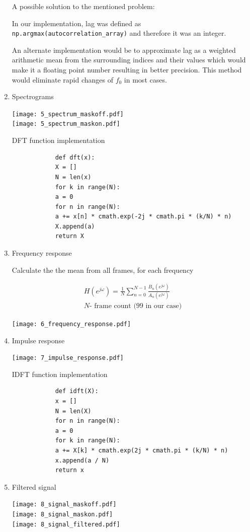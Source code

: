 \documentclass[a4paper, 11pt]{article}
\begin{document}
\begin{enumerate}
		\vspace{2mm}
		A possible solution to the mentioned problem:

		In our implementation, lag was defined as \texttt{np.argmax(autocorrelation\_array)} and therefore it was an integer.

		An alternate implementation would be to approximate lag as a weighted arithmetic mean from the surrounding indices and their values
		which would make it a floating point number resulting in better precision.
		This method would eliminate rapid changes of $f_0$ in most cases.

		\item
		Spectrograms

		\texttt{[image: 5\_spectrum\_maskoff.pdf]} \\
		\texttt{[image: 5\_spectrum\_maskon.pdf]}

		\newpage

		DFT function implementation

		\begin{verbatim}
			def dft(x):
			X = []
			N = len(x)
			for k in range(N):
			a = 0
			for n in range(N):
			a += x[n] * cmath.exp(-2j * cmath.pi * (k/N) * n)
			X.append(a)
			return X
		\end{verbatim}

		\item
		Frequency response

		Calculate the the mean from all frames, for each frequency

		\begin{gather*}
			H(e^{j\omega}) = \frac{1}{N} \sum_{n=0}^{N-1} \frac{ B_n(e^{j\omega}) }{ A_n(e^{j\omega}) } \\
			N \text{- frame count (99 in our case)}
		\end{gather*}

		\texttt{[image: 6\_frequency\_response.pdf]}

		\item
		Impulse response

		\texttt{[image: 7\_impulse\_response.pdf]}

		IDFT function implementation

		\begin{verbatim}
			def idft(X):
			x = []
			N = len(X)
			for n in range(N):
			a = 0
			for k in range(N):
			a += X[k] * cmath.exp(2j * cmath.pi * (k/N) * n)
			x.append(a / N)
			return x
		\end{verbatim}

		\newpage

		\item
		Filtered signal

		\texttt{[image: 8\_signal\_maskoff.pdf]} \\
		\texttt{[image: 8\_signal\_maskon.pdf]} \\
		\texttt{[image: 8\_signal\_filtered.pdf]}
	\end{enumerate}
\end{document}
